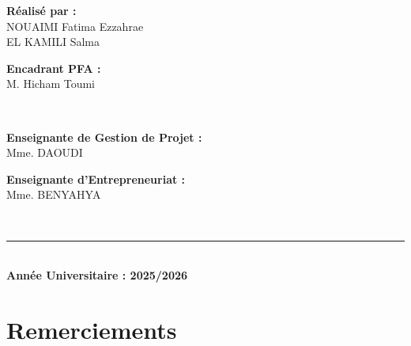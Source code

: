 \documentclass[12pt,a4paper]{report}
\begin{document}
\begin{titlepage}
\begin{center}
    \begin{minipage}[t]{0.45\textwidth}
      \begin{flushleft}
        {\small\color{darkgray}\bfseries Réalisé par :}\\[0.3cm]
        {\normalsize NOUAIMI Fatima Ezzahrae}\\[0.15cm]
        {\normalsize EL KAMILI Salma}
      \end{flushleft}
    \end{minipage}%
    \hfill
    \begin{minipage}[t]{0.45\textwidth}
      \begin{flushleft}
        {\small\color{darkgray}\bfseries Encadrant PFA :}\\[0.3cm]
        {\normalsize M. Hicham Toumi}
      \end{flushleft}
    \end{minipage}\\[1cm]

    \begin{minipage}[t]{0.45\textwidth}
      \begin{flushleft}
        {\small\color{darkgray}\bfseries Enseignante de Gestion de Projet :}\\[0.3cm]
        {\normalsize Mme. DAOUDI}
      \end{flushleft}
    \end{minipage}%
    \hfill
    \begin{minipage}[t]{0.45\textwidth}
      \begin{flushleft}
        {\small\color{darkgray}\bfseries Enseignante d'Entrepreneuriat :}\\[0.3cm]
        {\normalsize Mme. BENYAHYA}
      \end{flushleft}
    \end{minipage}\\[1.5cm]

    \rule{0.6\linewidth}{0.8pt}\\[0.4cm]
    {\large\bfseries Année Universitaire : 2025/2026}

  \end{center}
\end{titlepage}

\clearpage

\chapter*{Remerciements}
\thispagestyle{fancy}
\end{document}
